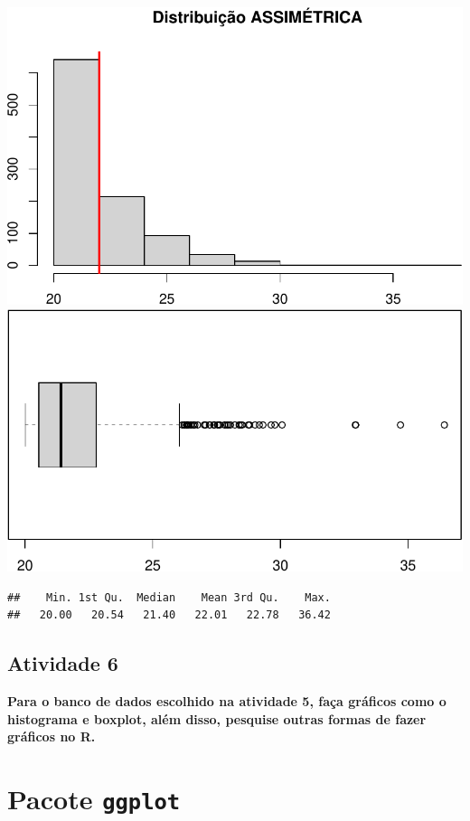 \documentclass[
]{book}
\begin{document}
\includegraphics{LivroEstatisticaR_files/figure-latex/unnamed-chunk-22-1.pdf} \includegraphics{LivroEstatisticaR_files/figure-latex/unnamed-chunk-22-2.pdf}

\begin{verbatim}
##    Min. 1st Qu.  Median    Mean 3rd Qu.    Max. 
##   20.00   20.54   21.40   22.01   22.78   36.42
\end{verbatim}

\section{Atividade 6}\label{atividade-6}

\textbf{Para o banco de dados escolhido na atividade 5, faça gráficos como o histograma e boxplot, além disso, pesquise outras formas de fazer gráficos no R.}

\chapter{\texorpdfstring{Pacote \texttt{ggplot}}{Pacote ggplot}}\label{pacote-ggplot}
\end{document}
